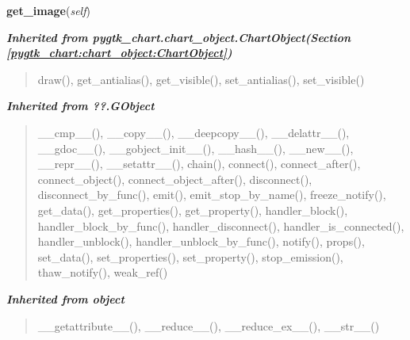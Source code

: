     \label{pygtk_chart:chart:Background:get_image}

    \vspace{0.5ex}

\hspace{.8\funcindent}\begin{boxedminipage}{\funcwidth}

    \raggedright \textbf{get\_image}(\textit{self})

\setlength{\parskip}{2ex}
\setlength{\parskip}{1ex}
    \end{boxedminipage}


\large{\textbf{\textit{Inherited from pygtk\_chart.chart\_object.ChartObject\textit{(Section \ref{pygtk_chart:chart_object:ChartObject})}}}}

\begin{quote}
draw(), get\_antialias(), get\_visible(), set\_antialias(), set\_visible()
\end{quote}

\large{\textbf{\textit{Inherited from ??.GObject}}}

\begin{quote}
\_\_cmp\_\_(), \_\_copy\_\_(), \_\_deepcopy\_\_(), \_\_delattr\_\_(), \_\_gdoc\_\_(), \_\_gobject\_init\_\_(), \_\_hash\_\_(), \_\_new\_\_(), \_\_repr\_\_(), \_\_setattr\_\_(), chain(), connect(), connect\_after(), connect\_object(), connect\_object\_after(), disconnect(), disconnect\_by\_func(), emit(), emit\_stop\_by\_name(), freeze\_notify(), get\_data(), get\_properties(), get\_property(), handler\_block(), handler\_block\_by\_func(), handler\_disconnect(), handler\_is\_connected(), handler\_unblock(), handler\_unblock\_by\_func(), notify(), props(), set\_data(), set\_properties(), set\_property(), stop\_emission(), thaw\_notify(), weak\_ref()
\end{quote}

\large{\textbf{\textit{Inherited from object}}}

\begin{quote}
\_\_getattribute\_\_(), \_\_reduce\_\_(), \_\_reduce\_ex\_\_(), \_\_str\_\_()
\end{quote}


